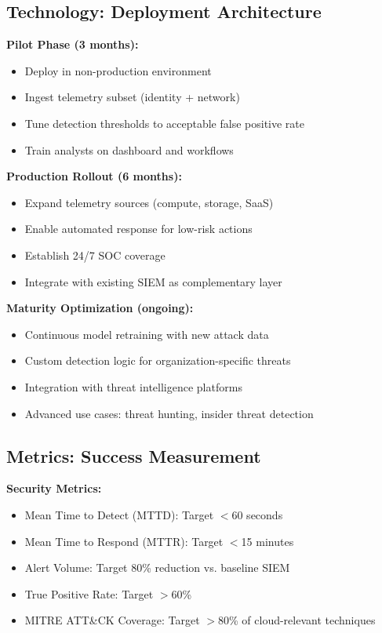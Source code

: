 \subsection{Technology: Deployment Architecture}
\textbf{Pilot Phase (3 months):}
\begin{itemize}
    \item Deploy in non-production environment
    \item Ingest telemetry subset (identity + network)
    \item Tune detection thresholds to acceptable false positive rate
    \item Train analysts on dashboard and workflows
\end{itemize}

\textbf{Production Rollout (6 months):}
\begin{itemize}
    \item Expand telemetry sources (compute, storage, SaaS)
    \item Enable automated response for low-risk actions
    \item Establish 24/7 SOC coverage
    \item Integrate with existing SIEM as complementary layer
\end{itemize}

\textbf{Maturity Optimization (ongoing):}
\begin{itemize}
    \item Continuous model retraining with new attack data
    \item Custom detection logic for organization-specific threats
    \item Integration with threat intelligence platforms
    \item Advanced use cases: threat hunting, insider threat detection
\end{itemize}

\subsection{Metrics: Success Measurement}
\textbf{Security Metrics:}
\begin{itemize}
    \item Mean Time to Detect (MTTD): Target $<$60 seconds
    \item Mean Time to Respond (MTTR): Target $<$15 minutes
    \item Alert Volume: Target 80\% reduction vs. baseline SIEM
    \item True Positive Rate: Target $>$60\%
    \item MITRE ATT\&CK Coverage: Target $>$80\% of cloud-relevant techniques
\end{itemize}

